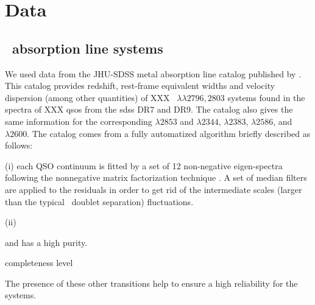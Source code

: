 \section{Data}

\subsection{\mgii\ absorption line systems}
We used data from the JHU-SDSS metal absorption line catalog published
by \citet{Zhu2013}. This catalog provides redshift, rest-frame
equivalent widths and velocity dispersion (among other quantities) of
XXX \mgii\ $\lambda\lambda 2796, 2803$ systems found in the spectra of
XXX \acp{qso} from the \ac{sdss} DR7 and DR9. The catalog also gives
the same information for the corresponding \mgi $\lambda 2853$ and
\feii $\lambda 2344$, $\lambda 2383$, $\lambda 2586$, and $\lambda
2600$. The catalog comes from a fully automatized algorithm briefly
described as follows:

(i) each QSO continuum is fitted by a set of 12 non-negative
eigen-spectra following the nonnegative matrix factorization technique
\citep[NMF;][]{Lee1999;Blanton2007}. A set of median filters are
applied to the residuals in order to get rid of the intermediate scales
(larger than the typical \mgii\ doublet separation) fluctuations.

(ii) 

and has a
high purity.

completeness level

The presence of these other transitions help to ensure a high
reliability for the \mgii systems.
